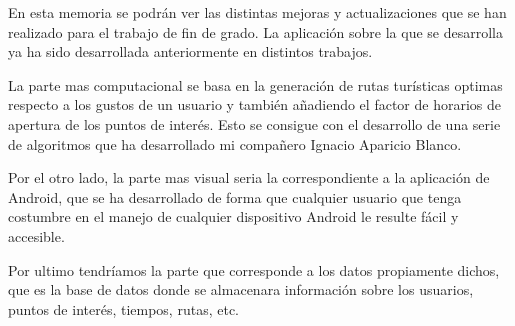
En esta memoria se podrán ver las distintas mejoras y actualizaciones que se han realizado para el trabajo de fin de grado. La aplicación sobre la que se desarrolla ya ha sido desarrollada anteriormente en distintos trabajos. 

La parte mas computacional se basa en la generación de rutas turísticas optimas respecto a los gustos de un usuario y también añadiendo el factor de horarios de apertura de los puntos de interés. Esto se consigue con el desarrollo de una serie de algoritmos que ha desarrollado mi compañero Ignacio Aparicio Blanco.

Por el otro lado, la parte mas visual seria la correspondiente a la aplicación de Android, que se ha desarrollado de forma que cualquier usuario que tenga costumbre en el manejo de cualquier dispositivo Android le resulte fácil y accesible.

Por ultimo tendríamos la parte que corresponde a los datos propiamente dichos, que es la base de datos donde se almacenara información sobre los usuarios, puntos de interés, tiempos, rutas, etc.

